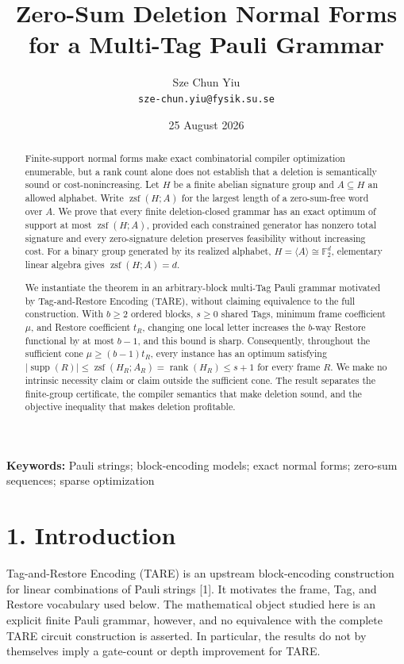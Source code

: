 \documentclass[
  11pt,
]{article}
\title{Zero-Sum Deletion Normal Forms for a Multi-Tag Pauli Grammar}
\author{Sze Chun Yiu\\\texttt{sze-chun.yiu@fysik.su.se}}
\date{25 August 2026}
\begin{document}
\maketitle

\begin{abstract}
Finite-support normal forms make exact combinatorial compiler
optimization enumerable, but a rank count alone does not establish that
a deletion is semantically sound or cost-nonincreasing. Let \(H\) be a
finite abelian signature group and \(A\subseteq H\) an allowed alphabet.
Write \(\operatorname{zsf}(H; A)\) for the largest length of a
zero-sum-free word over \(A\). We prove that every finite
deletion-closed grammar has an exact optimum of support at most
\(\operatorname{zsf}(H; A)\), provided each constrained generator has
nonzero total signature and every zero-signature deletion preserves
feasibility without increasing cost. For a binary group generated by its
realized alphabet, \(H=\langle A\rangle\cong\mathbb F_2^d\), elementary
linear algebra gives \(\operatorname{zsf}(H; A)=d\).

We instantiate the theorem in an arbitrary-block multi-Tag Pauli grammar
motivated by Tag-and-Restore Encoding (TARE), without claiming
equivalence to the full construction. With \(b\ge2\) ordered blocks,
\(s\ge0\) shared Tags, minimum frame coefficient \(\mu\), and Restore
coefficient \(t_R\), changing one local letter increases the \(b\)-way
Restore functional by at most \(b-1\), and this bound is sharp.
Consequently, throughout the sufficient cone \(\mu\ge (b-1)t_R\), every
instance has an optimum satisfying
\(|\operatorname{supp}(R)|\le \operatorname{zsf}(H_R;A_R) =\operatorname{rank}(H_R)\le s+1\)
for every frame \(R\). We make no intrinsic necessity claim or claim
outside the sufficient cone. The result separates the finite-group
certificate, the compiler semantics that make deletion sound, and the
objective inequality that makes deletion profitable.

\end{abstract}

\noindent\textbf{Keywords:} Pauli strings; block-encoding models; exact normal
forms; zero-sum sequences; sparse optimization

\hypertarget{introduction}{%
\section{1. Introduction}\label{introduction}}

Tag-and-Restore Encoding (TARE) is an upstream block-encoding
construction for linear combinations of Pauli strings {[}1{]}. It
motivates the frame, Tag, and Restore vocabulary used below. The
mathematical object studied here is an explicit finite Pauli grammar,
however, and no equivalence with the complete TARE circuit construction
is asserted. In particular, the results do not by themselves imply a
gate-count or depth improvement for TARE.
\end{document}
